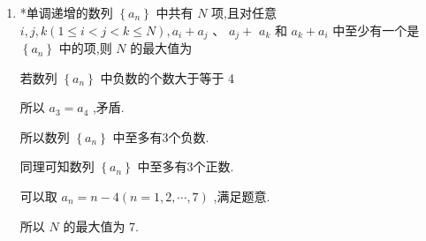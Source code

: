 \begin{enumerate}
\begin{jieda}
            因此数列 ${a}_{1},{a}_{2},{a}_{{k}_{1}},{a}_{{k}_{2}},\cdots ,{a}_{{k}_{n}},\cdots$ 是以 1 为首项，3 为公比的等比数列，故${a}_{{k}_{n}} = {3}^{n + 1} = 2{k}_{n} - 1$ ,所以 ${k}_{n} = \dfrac{{3}^{n + 1} + 1}{2}$ ,即数列 $\left\{  {k}_{n}\right\}$ 的通项公式为 ${k}_{n} = \dfrac{{3}^{n + 1} + 1}{2}$，故$\dfrac{{a}_{n}}{2{k}_{n} - 1} = \dfrac{{2n} - 1}{{3}^{n + 1}}$ .
            
            令 ${b}_{n} = \dfrac{{2n} - 1}{{3}^{n + 1}}$，则$b_{n+1} - b_n = \dfrac{{2n} + 1}{{3}^{n + 2}} - \dfrac{{2n} - 1}{{3}^{n + 1}} = \dfrac{({2n} + 1) - 3(2n-1)}{{3}^{n + 2}} = \dfrac{4-4n}{{3}^{n + 2}}$
            由此，数列 $\left\{  {b}_{n}\right\}$ 的最大项是 ${b}_{1}$ 与 ${b}_{2}$ .
            
            所以，对任意正整数 $n$ ,恒有 $\dfrac{{a}_{n}}{2{k}_{n} - 1} \leq  \dfrac{{a}_{m}}{2{k}_{m} - 1}\left( {m \in  \mathbf{N},m \geq  1}\right)$ 时, $m = 1$ 或 2 .
    \end{jieda}
    \item *单调递增的数列 $\left\{  {a}_{n}\right\}$ 中共有 $N$ 项,且对任意 $i,j,k\left( {1 \leq  i < j < k \leq  N}\right) ,{a}_{i} + {a}_{j}\text{ 、 }{a}_{j} +$  ${a}_{k}$ 和 ${a}_{k} + {a}_{i}$ 中至少有一个是 $\left\{  {a}_{n}\right\}$ 中的项,则 $N$ 的最大值为
    \begin{jieda}
        若数列 $\left\{  {a}_{n}\right\}$ 中负数的个数大于等于 4
        所以 ${a}_{3} = {a}_{4}$ ,矛盾. 
        
        所以数列 $\left\{  {a}_{n}\right\}$ 中至多有3个负数.
        
        同理可知数列 $\left\{  {a}_{n}\right\}$ 中至多有3个正数.
        
        可以取 ${a}_{n} = n - 4\left( {n = 1,2,\cdots ,7}\right)$ ,满足题意.
        
        所以 $N$ 的最大值为 7.
    \end{jieda}
\end{enumerate}

